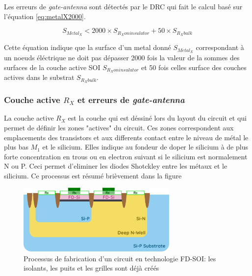 Les erreurs de \textit{gate-antenna} sont détectés par le DRC qui fait le calcul basé sur l'équation \ref*{eq:metalX2000}.

\begin{equation}
  S_{Metal_{X}} <2000 \times S_{R_{X} on insulator}+50 \times S_{R_X bulk}
  \label{eq:metalX2000}
\end{equation}

Cette équation indique que la surface d'un metal donné  $S_{Metal_{X}}$ correspondant à un noeuds éléctrique ne doit pas dépasser 2000 fois la valeur de la sommes des surfaces de la couche active SOI $S_{R_{X} on insulator}$ et 50 fois celles surface des couches actives dans le substrat $S_{R_X bulk}$.

\subsubsection{Couche active $R_{X}$ et erreurs de \textit{gate-antenna}}
La couche active $R_{X}$ est la couche qui est déssiné lors du layout du circuit et qui permet de définir les zones "actives" du circuit. Ces zones correspondent aux emplacements des transistors et aux differents contact entre le niveau de métal le plus bas $M_1$ et le silicium. Elles indique au fondeur de doper le silicium à de plus forte concentration en trous ou en electron suivant si le silicium est normalement N ou P. Ceci permet d'eliminer les diodes Shotckley entre les métaux et le silicium. Ce processus est résumé brièvement dans la figure %

\begin{figure}[H]
  \centering
  \includegraphics[width=0.7\textwidth]{figures/FabSOI-MiddleEND-2.pdf}
  \caption{Processus de fabrication d'un circuit en technologie FD-SOI: les isolants, les puits et les grilles sont déjà créés}
  \label{fig:process fdsoi 2}
\end{figure}

